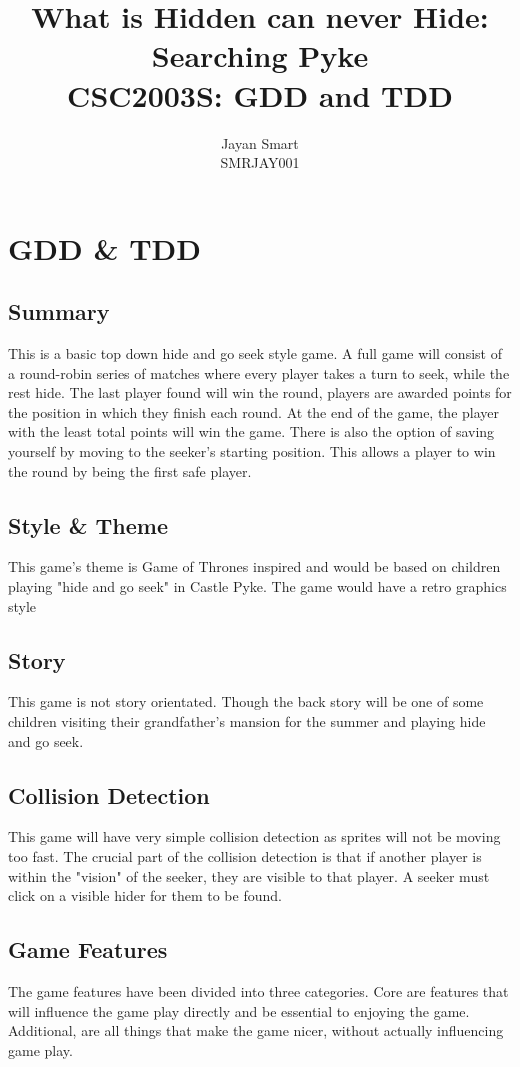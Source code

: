 \documentclass[]{report}
\title{What is Hidden can never Hide: Searching Pyke\\CSC2003S: GDD and TDD}
\author{Jayan Smart\\SMRJAY001}
\begin{document}
\maketitle

\tableofcontents

\chapter{GDD \& TDD}

\section{Summary}
This is a basic top down hide and go seek style game. A full game will consist of a round-robin series of matches where every player takes a turn to seek, while the rest hide. The last player found will win the round, players are awarded points for the position in which they finish each round. At the end of the game, the player with the least total points will win the game. There is also the option of saving yourself by moving to the seeker's starting position. This allows a player to win the round by being the first safe player.

\section{Style \& Theme}
This game's theme is Game of Thrones inspired and would be based on children playing "hide and go seek" in Castle Pyke. The game would have a retro graphics style

\section{Story}
This game is not story orientated. Though the back story will be one of some children visiting their grandfather's mansion for the summer and playing hide and go seek.

\section{Collision Detection}
This game will have very simple collision detection as sprites will not be moving too fast. The crucial part of the collision detection is that if another player is within the "vision" of the seeker, they are visible to that player. A seeker must click on a visible hider for them to be found.

\section{Game Features}
The game features have been divided into three categories. Core are features that will influence the game play directly and be essential to enjoying the game. Additional, are all things that make the game nicer, without actually influencing game play.
\end{document}
